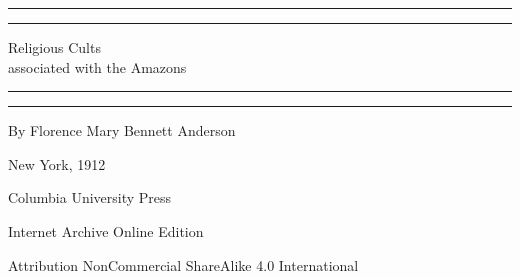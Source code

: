 \documentclass[a4paper, 12pt, oneside]{article}
\begin{document}
\begin{titlepage} %
	\centering %
	\scshape %

	
	\rule{\textwidth}{1.6pt}\vspace*{-\baselineskip}\vspace*{2pt} %
	\rule{\textwidth}{0.4pt} %
	
	\vspace{0.75\baselineskip} %

        {\LARGE Religious Cults \\associated with the Amazons} %
	
	\vspace{0.75\baselineskip} %
	
	\rule{\textwidth}{0.4pt}\vspace*{-\baselineskip}\vspace{3.2pt} %
	\rule{\textwidth}{1.6pt} %
	
	\vspace{1\baselineskip} %
	
	
	{\large By Florence Mary Bennett Anderson} %
	
	\vspace*{1\baselineskip} %
	
	
	\vspace{1\baselineskip} %

	
	
		
	\vspace*{\fill}%
	
	{\small New York, 1912}%
	
	{\small Columbia University Press} %

	\vspace{1\baselineskip} %

    Internet Archive Online Edition  %
	
	{\small Attribution NonCommercial ShareAlike 4.0 International } %
\end{titlepage}
\clearpage
\tableofcontents
\clearpage
\end{document}
